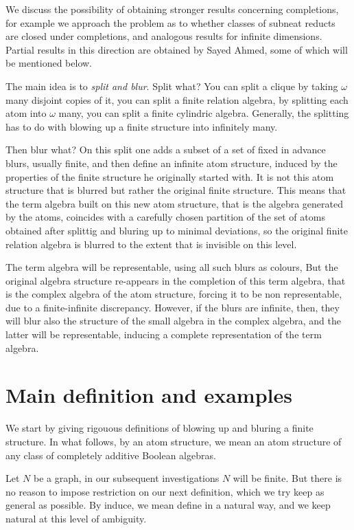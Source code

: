 \documentclass[12pt]{article}
\theoremstyle{definition}
\begin{document}
We discuss the possibility of obtaining stronger results concerning completions, 
for example we approach the problem as to whether classes of subneat reducts are 
closed under completions, and analogous results 
for infinite dimensions.  Partial results in this direction are obtained by Sayed Ahmed, some of which will be 
mentioned below.

The main idea is to {\it split and blur}. Split  what? You can split a clique by taking $\omega$ many disjoint copies of it, 
you can split  a finite relation algebra, 
by splitting each atom into $\omega$ many, you can split a finite cylindric algebra. Generally, the splitting has to do with blowing up a finite structure
into infinitely many.

Then blur what? On this split one adds a subset of  a set of fixed in advance blurs, usually finite,
and then define an infinite atom structure, induced by the properties of the finite structure he originally started with.
It is not this atom structure that is blurred but rather the original finite structure.
This means that the term algebra built on this new atom structure, 
that is the algebra generated by the atoms,
coincides with a carefully chosen partition of the set of atoms obtained after splittig and bluring
up to minimal  deviations, so the original finite relation algebra is blurred to the extent that is invisible on this level.

The term algebra will be representable, using all such blurs as colours,
But the original algebra structure re-appears in the completion of this term algebra, that is the complex algebra of the atom structure,
forcing it to be
non representable, due to a finite-infinite discrepancy. However, if the blurs are infinite, then, they will blur also the structure
of the small algebra in the complex algebra, and the latter will be representable, inducing a complete representation of 
the term algebra.

\section{Main definition and examples}

We start by giving rigouous definitions of blowing up and bluring a finite structure.
In what follows, by an atom structure, we mean an atom structure of any class of completely additive Boolean algebras.

Let $N$ be a graph, in our subsequent investigations $N$ will be finite. But there is no reason to impose restriction on our next definition, which we try
keep as general as possible. By induce, we mean define in a natural way, and we keep natural at this level of ambiguity.
\end{document}
